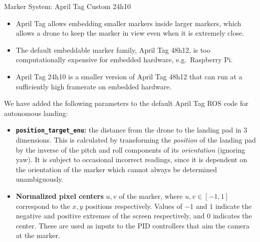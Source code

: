 \documentclass[final, 20pt]{beamer}
\newlength{\colwidth}
\begin{document}
\begin{frame}[t]
\begin{columns}[t]
\begin{column}{\colwidth}
  \begin{block}{Marker System: April Tag Custom 24h10}
    \begin{itemize}
      \item April Tag allows embedding smaller markers inside larger markers,
            which allows a drone to keep the marker in view even when it is extremely close.
      \item The default embeddable marker family, April Tag 48h12, is too computationally expensive for embedded hardware, e.g.~Raspberry Pi.
      \item April Tag 24h10 is a smaller version of April Tag 48h12 that can run at a sufficiently high framerate on embedded hardware.
    \end{itemize}
    We have added the following parameters to the default April Tag ROS code for autonomous landing:
    \begin{itemize}
      \item \textbf{\texttt{position\_target\_enu}:} the distance from the drone to the landing pad in 3 dimensions.
                    This is calculated by transforming the \textit{position} of the landing pad by
                    the inverse of the pitch and roll components of its \textit{orientation} (ignoring yaw).
                    It is subject to occasional incorrect readings, since it is dependent on the orientation of the marker which cannot always be determined unambiguously.
      \item \textbf{Normalized pixel centers} $u,v$ of the marker, where $u,v \in [-1,1]$ correspond to the $x,y$ positions respectively.
                    Values of $-1$ and $1$ indicate the negative and positive extremes of the screen respectively, and $0$ indicates the center.
                    These are used as inputs to the PID controllers that aim the camera at the marker.
    \end{itemize}



\end{block}
\end{column}
\end{columns}
\end{frame}
\end{document}
